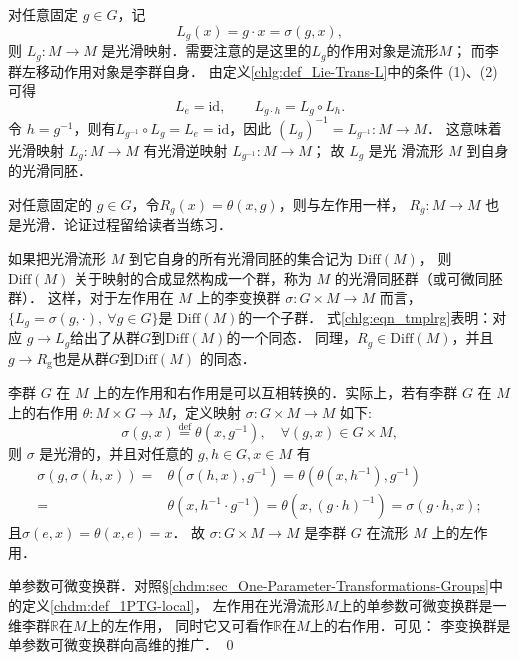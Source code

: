 对任意固定 $g \in G$，记
\begin{equation}
    L_g(x)=g \cdot x=\sigma( g,x),
\end{equation}
则 $L_g: M \rightarrow M$ 是光滑映射．需要注意的是这里的$L_g$的作用对象是流形$M$；
而李群左移动作用对象是李群自身．
由定义\ref{chlg:def_Lie-Trans-L}中的条件 (1)、(2) 可得
\begin{equation}\label{chlg:eqn_tmplrg}
    L_e  =\mathrm{id}, \qquad
    L_{g \cdot h}  =L_g \circ L_h .
\end{equation}
令 $h=g^{-1}$，则有$L_{g^{-1}} \circ L_{g}=L_{e}=\mathrm{id} $，因此
$(L_{g})^{-1}=L_{g^{-1}}: M \to M $．
这意味着光滑映射 $L_{g}: M \to M$ 有光滑逆映射 $L_{g^{-1}}: M \to M$； 
故 $L_{g}$ 是光 滑流形 $M$ 到自身的光滑{\heiti 同胚}．

对任意固定的 $g \in G$，令$R_g(x)=\theta(x,g)$，则与左作用一样，
$R_g: M \to M$ 也是光滑．论证过程留给读者当练习．

如果把光滑流形 $M$ 到它自身的所有光滑同胚的集合记为 $\mathrm{Diff}(M)$，
则 $\mathrm{Diff}(M)$ 关于映射的合成显然构成一个群，称为 $M$ 的光滑{\heiti 同胚群}（或可微同胚群）．
这样，对于左作用在 $M$ 上的李变换群 $\sigma: G \times M \to M$ 而言，
$\{L_g=\sigma(g,\cdot),\ \forall g \in G\}$是 $\mathrm{Diff}(M)$的一个子群．
式\eqref{chlg:eqn_tmplrg}表明：对应 $g \to L_{g}$给出了从群$G$到$\mathrm{Diff}(M)$的一个同态．
同理，$R_g \in \mathrm{Diff}(M)$，并且 $g \to R_{\mathrm{g}}$也是从群$G$到$\mathrm{Diff}(M)$ 的同态．




李群 $G$ 在 $M$ 上的左作用和右作用是可以互相转换的．实际上，若有李群 $G$ 在 $M$ 
上的右作用 $\theta: M \times G \to M$，定义映射 $\sigma: G \times M \to M$ 如下:
\begin{equation}
    \sigma(g, x)\overset{\mathrm {def}}{=} \theta(x, g^{-1}), \quad \forall(g, x) \in G \times M,
\end{equation}
则 $\sigma$ 是光滑的，并且对任意的 $g, h \in G, x \in M$ 有
\begin{align*}
    \sigma(g, \sigma(h, x))=&\theta\left(\sigma(h, x), g^{-1}\right) 
    =  \theta\left(\theta\left(x, h^{-1}\right), g^{-1}\right) \\
    =& \theta\left(x, h^{-1} \cdot g^{-1}\right) 
    = \theta\left(x,(g \cdot h)^{-1}\right)=\sigma(g \cdot h, x) ;
\end{align*}
且$\sigma(e, x)=\theta(x, e)=x$．
故 $\sigma: G \times M \rightarrow M$ 是李群 $G$ 在流形 $M$ 上的左作用．


\begin{example}
    单参数可微变换群．对照\S\ref{chdm:sec_One-Parameter-Transformations-Groups}中的定义\ref{chdm:def_1PTG-local}，
    左作用在光滑流形$M$上的单参数可微变换群是一维李群$\mathbb{R}$在$M$上的左作用，
    同时它又可看作$\mathbb{R}$在$M$上的右作用．可见：
    李变换群是单参数可微变换群向高维的推广． \qed
\end{example}

